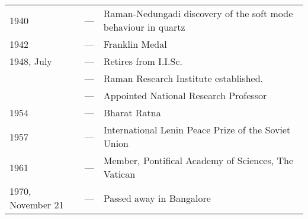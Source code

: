 \begin{longtable}{@{}lcp{6cm}<{\raggedright}@{}}
1940 & --- & Raman-Nedungadi discovery of the soft mode behaviour in quartz\\
1942 & --- & Franklin Medal\\
1948, July & --- & Retires from I.I.Sc.\\
& --- & Raman Research Institute established.\\
& --- & Appointed National Research Professor\\
1954 & --- & Bharat Ratna\\
1957 & --- & International Lenin Peace Prize of the Soviet Union\\
1961 & --- & Member, Pontifical Academy of Sciences, The Vatican\\
1970, November 21 & --- & Passed away in Bangalore
\end{longtable}


